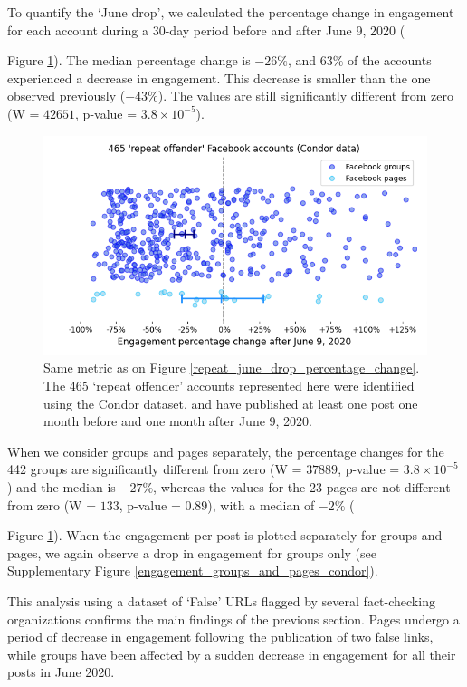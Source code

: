 \documentclass[review]{elsarticle}
\begin{document}
To quantify the ‘June drop’, we calculated the percentage change in engagement for each account during a 30-day period before and after June 9, 2020 ({Figure \ref{condor_june_drop_percentage_change}).
The median percentage change is $-26\%$, and $63\%$ of the accounts experienced a decrease in engagement. 
This decrease is smaller than the one observed previously ($-43\%$).
The values are still significantly different from zero (W = $42651$, p-value = $3.8 \times 10^{-5}$).

\begin{figure}[!h]
\centering
\includegraphics[scale=0.5]{./../figure/condor_june_drop_percentage_change.png}
\caption{
Same metric as on Figure \ref{repeat_june_drop_percentage_change}.
The 465 `repeat offender' accounts represented here were identified using the Condor dataset, and have published at least one post one month before and one month after June 9, 2020.
}
\label{condor_june_drop_percentage_change}
\end{figure}

When we consider groups and pages separately, the percentage changes for the 442 groups are significantly different from zero (W = $37889$, p-value = $3.8 \times 10^{-5}$) and the median is $-27\%$, whereas the values for the 23 pages are not different from zero (W = $133$, p-value = $0.89$), with a median of $-2\%$ ({Figure \ref{condor_june_drop_percentage_change}).
When the engagement per post is plotted separately for groups and pages, we again observe a drop in engagement for groups only (see Supplementary Figure \ref{engagement_groups_and_pages_condor}).

This analysis using a dataset of `False' URLs flagged by several fact-checking organizations confirms the main findings of the previous section.
Pages undergo a period of decrease in engagement following the publication of two false links, while groups have been affected by a sudden decrease in engagement for all their posts in June 2020.

}}
\end{document}
